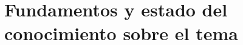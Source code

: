 \section{Fundamentos y estado del conocimiento sobre el tema}
\iffalse
Escriba una breve introducción general al tema y cite y comente las mayores
contribuciones en el tema específico, incluyendo bibliografıa actualizada.
\fi



